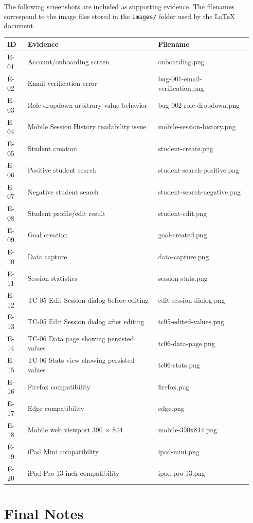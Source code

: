 \documentclass[11pt,a4paper]{article}
\begin{document}
The following screenshots are included as supporting evidence. The filenames correspond to the image files stored in the \texttt{images/} folder used by the LaTeX document.

\begin{longtable}{p{}p{}p{}}
\toprule
\textbf{ID} & \textbf{Evidence} & \textbf{Filename} \\
\midrule
E-01 & Account/onboarding screen & onboarding.png \\
E-02 & Email verification error & bug-001-email-verification.png \\
E-03 & Role dropdown arbitrary-value behavior & bug-002-role-dropdown.png \\
E-04 & Mobile Session History readability issue & mobile-session-history.png \\
E-05 & Student creation & student-create.png \\
E-06 & Positive student search & student-search-positive.png \\
E-07 & Negative student search & student-search-negative.png \\
E-08 & Student profile/edit result & student-edit.png \\
E-09 & Goal creation & goal-created.png \\
E-10 & Data capture & data-capture.png \\
E-11 & Session statistics & session-stats.png \\
E-12 & TC-05 Edit Session dialog before editing & edit-session-dialog.png \\
E-13 & TC-05 Edit Session dialog after editing & tc05-edited-values.png \\
E-14 & TC-06 Data page showing persisted values & tc06-data-page.png \\
E-15 & TC-06 Stats view showing persisted values & tc06-stats.png \\
E-16 & Firefox compatibility & firefox.png \\
E-17 & Edge compatibility & edge.png \\
E-18 & Mobile web viewport 390 $\times$ 844 & mobile-390x844.png \\
E-19 & iPad Mini compatibility & ipad-mini.png \\
E-20 & iPad Pro 13-inch compatibility & ipad-pro-13.png \\
\bottomrule
\end{longtable}

\section{Final Notes}
\end{document}
